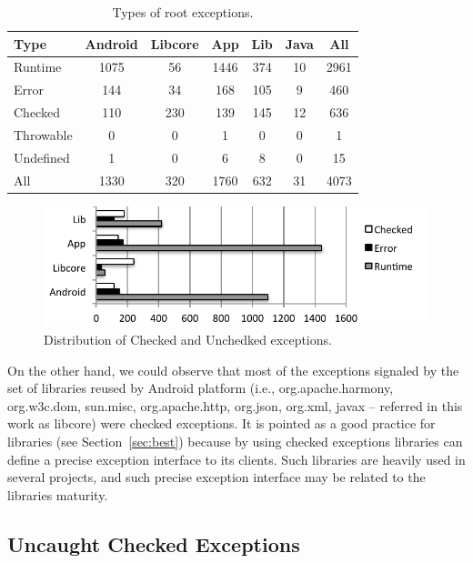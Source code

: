 \documentclass[conference]{IEEEtran}
\begin{document}
\begin{table}
\centering
\begin{tabular}{lcccccc}
    \hline
    \bfseries{Type} & \bfseries{Android} & \bfseries{Libcore} & \bfseries{App} & \bfseries{Lib} & \bfseries{Java} & \bfseries{All}\\
    \hline

Runtime	&	1075	&	56	&	1446	&	374	&	10	&	2961	\\
Error	&	144	&	34	&	168	&	105	&	9	&	460	\\
Checked	&	110	&	230	&	139	&	145	&	12	&	636	\\
Throwable	&	0	&	0	&	1	&	0	&	0	&	1	\\
Undefined	&	1	&	0	&	6	&	8	&	0	&	15	\\
    \hline
All		& 1330	&	320	&	1760	&	632	&	31	&	4073	\\
    \hline
  \end{tabular}
\caption{Types of root exceptions.}
  \label{tab:typeroottab}
\end{table}


\begin{figure}
\centering
\includegraphics[width=\hsize]{exception_types.pdf}
\caption{Distribution of Checked and Unchedked exceptions.}
\label{fig:typeroot}
\end{figure}

On the other hand, we could observe that most of the exceptions signaled by the set of 
libraries reused by Android platform (i.e., org.apache.harmony,
org.w3c.dom, sun.misc, org.apache.http, org.json, org.xml, javax -- referred in
this work as libcore) were checked exceptions. It is pointed as a good practice
for libraries (see Section~\ref{sec:best}) because by using checked exceptions
libraries can define a precise exception interface to its clients. Such
libraries are heavily used in several projects, and such precise exception
interface may be related to the libraries maturity.

\subsection{Uncaught Checked Exceptions}
\end{document}
